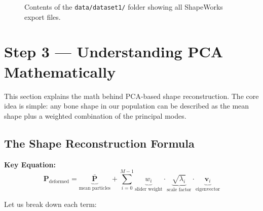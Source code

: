\documentclass[12pt,a4paper]{article}
\begin{document}
\begin{figure}[H]
    \centering
    \caption{Contents of the \texttt{data/dataset1/} folder showing all ShapeWorks export files.}
    \label{fig:data_folder}
\end{figure}

\section{Step 3 --- Understanding PCA Mathematically}

This section explains the math behind PCA-based shape reconstruction. The core idea is simple: any bone shape in our population can be described as the mean shape plus a weighted combination of the principal modes.

\subsection{The Shape Reconstruction Formula}

\begin{mdframed}[backgroundcolor=codegray, linecolor=shapeworksblue, linewidth=1.5pt]
\textbf{Key Equation:}
\begin{equation}
\mathbf{P}_{\text{deformed}} = \underbrace{\bar{\mathbf{P}}}_{\text{mean particles}} + \sum_{i=0}^{M-1} \underbrace{w_i}_{\text{slider weight}} \cdot \underbrace{\sqrt{\lambda_i}}_{\text{scale factor}} \cdot \underbrace{\mathbf{v}_i}_{\text{eigenvector}}
\label{eq:pca}
\end{equation}
\end{mdframed}

Let us break down each term:
\end{document}
